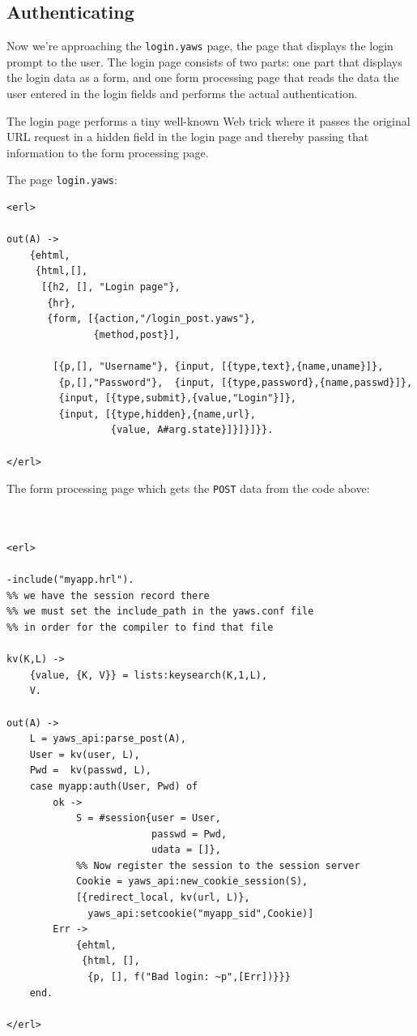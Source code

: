 \documentclass[11pt,oneside,english]{book}
\begin{document}
\subsection{Authenticating}

Now we're approaching the \verb+login.yaws+ page, the page that
displays the login prompt to the user. The login page consists of two
parts: one part that displays the login data as a form, and one form
processing page that reads the data the user entered in the login
fields and performs the actual authentication.

The login page performs a tiny well-known Web trick where it passes
the original URL request in a hidden field in the login page and
thereby passing that information to the form processing page.

The page \verb+login.yaws+:

\begin{verbatim}
<erl>

out(A) ->
    {ehtml,
     {html,[],
      [{h2, [], "Login page"},
       {hr},
       {form, [{action,"/login_post.yaws"},
               {method,post}],

        [{p,[], "Username"}, {input, [{type,text},{name,uname}]},
         {p,[],"Password"},  {input, [{type,password},{name,passwd}]},
         {input, [{type,submit},{value,"Login"}]},
         {input, [{type,hidden},{name,url},
                  {value, A#arg.state}]}]}]}}.

</erl>
\end{verbatim}



The form processing page which gets the \verb+POST+ data from the code
above:

\begin{verbatim}


<erl>

-include("myapp.hrl").
%% we have the session record there
%% we must set the include_path in the yaws.conf file
%% in order for the compiler to find that file

kv(K,L) ->
    {value, {K, V}} = lists:keysearch(K,1,L),
    V.

out(A) ->
    L = yaws_api:parse_post(A),
    User = kv(user, L),
    Pwd =  kv(passwd, L),
    case myapp:auth(User, Pwd) of
        ok ->
            S = #session{user = User,
                         passwd = Pwd,
                         udata = []},
            %% Now register the session to the session server
            Cookie = yaws_api:new_cookie_session(S),
            [{redirect_local, kv(url, L)},
              yaws_api:setcookie("myapp_sid",Cookie)]
        Err ->
            {ehtml,
             {html, [],
              {p, [], f("Bad login: ~p",[Err])}}}
    end.

</erl>



\end{verbatim}
\end{document}
